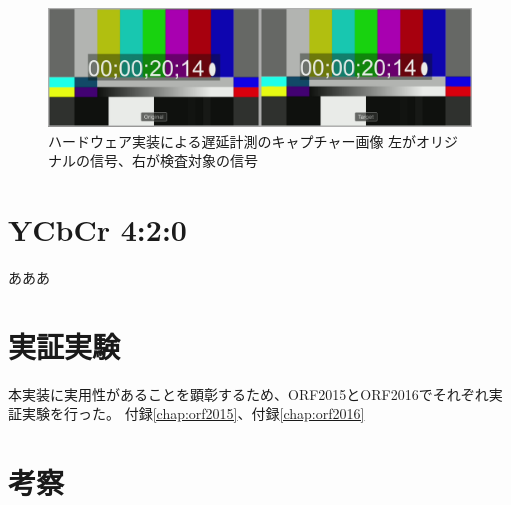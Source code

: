 \begin{figure}[htbp]
  \begin{center}
    \includegraphics[bb=0 0 1920 540,width=14cm]{img/evaluate-delay-hardware.png}
  \end{center}
  \caption[ハードウェア実装による遅延計測のキャプチャー画像]{ハードウェア実装による遅延計測のキャプチャー画像 左がオリジナルの信号、右が検査対象の信号}
  \label{fig:evaluate-delay-hardware}
\end{figure}

\section{YCbCr 4:2:0}
あああ



\section{実証実験}
本実装に実用性があることを顕彰するため、ORF2015とORF2016でそれぞれ実証実験を行った。
付録\ref{chap:orf2015}、付録\ref{chap:orf2016}

\section{考察}
